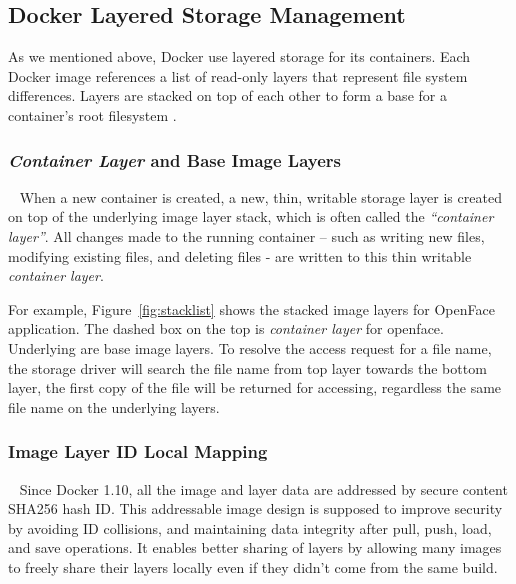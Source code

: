 

\subsection{Docker Layered Storage Management}\label{aufsIntroduction}

As we mentioned above, Docker use layered storage for its containers. Each Docker image references a list of read-only layers that represent file system differences. Layers are stacked on top of each other to form a base for a container’s root filesystem \cite{dockerlayer}. 

\smallbreak
\subsubsection{\textit{Container Layer} and Base Image Layers}
~\smallbreak
When a new container is created, a new, thin, writable storage layer is created on top of the underlying image layer stack, which is often called the \textit{``container layer''}. All changes made to the running container -- such as writing new files, modifying existing files, and deleting files - are written to this thin writable \textit{container layer}\cite{dockerlayer}.

For example, 
Figure~\ref{fig:stacklist} shows the stacked image layers for OpenFace application. The dashed box on the top is \textit{container layer} for openface. Underlying are base image layers. To resolve the access request for a file name, the storage driver will search the file name from top layer towards the bottom layer, the first copy of the file will be returned for accessing, regardless the same file name on the underlying layers.




\smallbreak
\subsubsection{Image Layer ID Local Mapping}
~\smallbreak
Since Docker 1.10, all the image and layer data are addressed by secure content SHA256 hash ID. 
This addressable image design is supposed to improve security by avoiding ID collisions, and maintaining data integrity after pull, push, load, and save operations. It enables better sharing of layers by allowing many images to freely share their layers locally even if they didn’t come from the same build\cite{dockerlayer}. 

